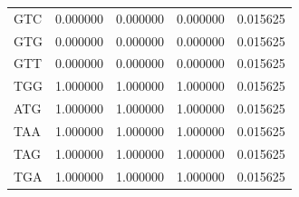 \begin{tabular}{lrrrr}
GTC & 0.000000 & 0.000000 & 0.000000 & 0.015625 \\
GTG & 0.000000 & 0.000000 & 0.000000 & 0.015625 \\
GTT & 0.000000 & 0.000000 & 0.000000 & 0.015625 \\
TGG & 1.000000 & 1.000000 & 1.000000 & 0.015625 \\
ATG & 1.000000 & 1.000000 & 1.000000 & 0.015625 \\
TAA & 1.000000 & 1.000000 & 1.000000 & 0.015625 \\
TAG & 1.000000 & 1.000000 & 1.000000 & 0.015625 \\
TGA & 1.000000 & 1.000000 & 1.000000 & 0.015625 \\
\bottomrule
\end{tabular}
